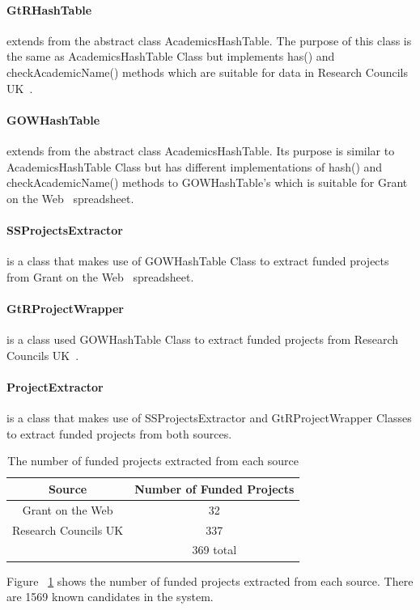 \paragraph{GtRHashTable} extends from the abstract class AcademicsHashTable. The purpose of this class is the same as AcademicsHashTable Class but
implements has() and checkAcademicName() methods which are suitable for data in Research Councils UK~\cite{gtr}.
\paragraph{GOWHashTable} extends from the abstract class AcademicsHashTable. Its purpose is similar to AcademicsHashTable Class but
has different implementations of hash() and checkAcademicName() methods to GOWHashTable's which is suitable for Grant on the Web~\cite{gow} spreadsheet.
\paragraph{SSProjectsExtractor} is a class that makes use of GOWHashTable Class to extract funded projects from Grant on the Web~\cite{gow} spreadsheet.
\paragraph{GtRProjectWrapper} is a class used GOWHashTable Class to extract funded projects from Research Councils UK~\cite{gtr}.
\paragraph{ProjectExtractor} is a class that makes use of SSProjectsExtractor and GtRProjectWrapper Classes to extract funded projects from both sources.

\begin{table}
\centering
\begin{tabular}{|c|c|}
\hline \textbf{Source} & \textbf{Number of Funded Projects} \\
\hline Grant on the Web & 32 \\
\hline Research Councils UK & 337 \\
\hline   & 369 total \\ 
\hline
\end{tabular}
\caption{The number of funded projects extracted from each source} \label{table:stats}
\end{table}
Figure ~\ref{table:stats} shows the number of funded projects extracted from each source. There are 1569 known candidates in the system.

